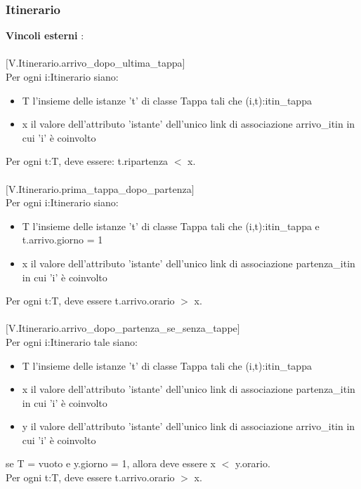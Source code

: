 \documentclass[12pt, letterpaper]{article}
\newcommand{\acc}{\\\hphantom{}\\}
\begin{document}
\subsubsection{Itinerario}
\textbf{Vincoli esterni} :\acc
$[$V.Itinerario.arrivo\_dopo\_ultima\_tappa$]$\\
\hphantom{ident}Per ogni i:Itinerario siano: \begin{itemize}
    \item  T l'insieme delle istanze 't' di classe Tappa tali che (i,t):itin\_tappa
    \item x il valore dell'attributo 'istante' dell'unico link di associazione arrivo\_itin in cui 'i' è coinvolto
\end{itemize}
\hphantom{ident}Per ogni t:T, deve essere: t.ripartenza $<$ x.\acc
$[$V.Itinerario.prima\_tappa\_dopo\_partenza$]$\\
\hphantom{ident}Per ogni i:Itinerario siano: \begin{itemize}
    \item  T l'insieme delle istanze 't' di classe Tappa tali che (i,t):itin\_tappa e t.arrivo.giorno = 1
    \item  x il valore dell'attributo 'istante' dell'unico link di associazione partenza\_itin in cui 'i' è coinvolto
\end{itemize}
\hphantom{ident}Per ogni t:T, deve essere t.arrivo.orario $>$ x.\acc
$[$V.Itinerario.arrivo\_dopo\_partenza\_se\_senza\_tappe$]$\\
\hphantom{ident}Per ogni i:Itinerario tale siano:  \begin{itemize}
    \item T l'insieme delle istanze 't' di classe Tappa tali che (i,t):itin\_tappa
    \item x il valore dell'attributo 'istante' dell'unico link di associazione partenza\_itin in cui 'i' è coinvolto
    \item y il valore dell'attributo 'istante' dell'unico link di associazione arrivo\_itin in cui 'i' è coinvolto

\end{itemize}
\hphantom{ident}se T = vuoto e y.giorno = 1, allora deve essere x $<$ y.orario.\\
\hphantom{ident}Per ogni t:T, deve essere t.arrivo.orario $>$ x.
\end{document}
